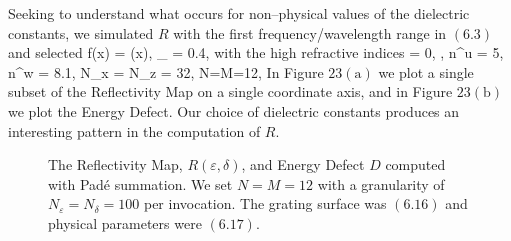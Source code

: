 Seeking to understand what occurs for non--physical values of the dielectric constants, we simulated $R$ with the first frequency/wavelength range in $(6.3)$ and selected
\be
f(x) = \cos(x),
\quad
\varepsilon_{} = 0.4,
\ee
with the high refractive indices
\be
\alpha = 0,
\quad
{},
\quad
n^u = 5,
\quad
n^w = 8.1,
\quad
N_x = N_z = 32,
\quad
N=M=12,
\ee
In Figure $23(\text{a})$ we plot a single subset of the
Reflectivity Map on a single coordinate axis, and in 
Figure $23(\text{b})$ we plot the Energy Defect. Our choice of dielectric constants produces an interesting pattern in the computation of $R$.

%
%
\vspace{-19mm}
\begin{figure}[H]
    \centering
    \vspace{3mm}
    \caption{The Reflectivity Map, $R(\varepsilon,\delta)$, and Energy Defect $D$
    computed with Pad\'e summation. We set $N=M=12$ 
    with a granularity of $N_{\varepsilon}=N_{\delta}=100$ per invocation. The grating surface was $(6.16)$ and physical parameters were $(6.17)$.}
    \label{Fig:RM:Single Case 1}
\end{figure}
